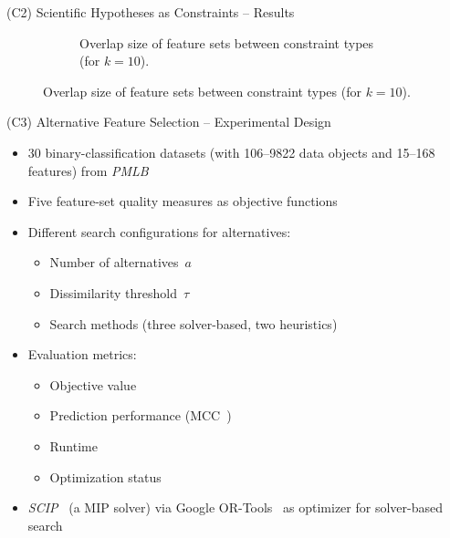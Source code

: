 \documentclass[en, navbarinline, handout]{sdqbeamer}
\begin{document}
\begin{frame}[t]{(C2) Scientific Hypotheses as Constraints -- Results}
\begin{figure}
\begin{subfigure}{0.48\textwidth}
			\caption*{Overlap size of feature sets between constraint types (for $k=10$).}
		\end{subfigure}
	\end{figure}
\end{frame}

\begin{frame}[t]{(C3) Alternative Feature Selection -- Experimental Design}
	\begin{itemize}
		\item 30 binary-classification datasets (with 106--9822 data objects and 15--168 features) from \emph{PMLB}~\cite{olson2017pmlb, romano2021pmlb}
		\item Five feature-set quality measures as objective functions
		\item Different search configurations for alternatives:
		\begin{itemize}
			\item Number of alternatives~$a$
			\item Dissimilarity threshold~$\tau$
			\item Search methods (three solver-based, two heuristics)
		\end{itemize}
		\item Evaluation metrics:
		\begin{itemize}
			\item Objective value
			\item Prediction performance (MCC~\cite{matthews1975comparison})
			\item Runtime
			\item Optimization status
		\end{itemize}
		\item \emph{SCIP}~\cite{bestuzheva2021scip} (a MIP solver) via {Google OR-Tools}~\cite{perron2022or-tools} as optimizer for solver-based search
	\end{itemize}
\end{frame}
\end{document}
